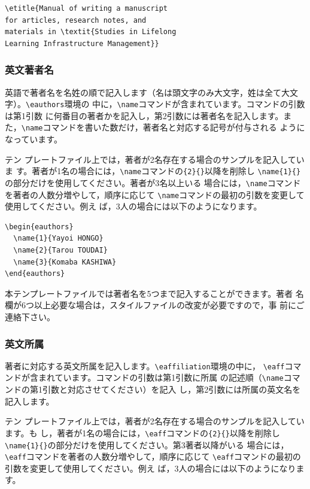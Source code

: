 \documentclass[b5paper,10pt,twocolumn,tombow]{jarticle}
\begin{document}
\begin{verbatim}
\etitle{Manual of writing a manuscript
for articles, research notes, and
materials in \textit{Studies in Lifelong
Learning Infrastructure Management}}
\end{verbatim}

\subsubsection{英文著者名}
英語で著者名を名姓の順で記入します（名は頭文字のみ大文字，姓は全て大文字）。\verb|\eauthors|環境の
中に，\verb|\name|コマンドが含まれています。コマンドの引数は第1引数
に何番目の著者かを記入し，第2引数には著者名を記入します。ま
た，\verb|\name|コマンドを書いた数だけ，著者名と対応する記号が付与される
ようになっています。


テン
プレートファイル上では，著者が2名存在する場合のサンプルを記入していま
す。著者が1名の場合には，\verb|\name|コマンドの\verb|{2}{}|以降を削除し
\verb|\name{1}{}|の部分だけを使用してください。著者が3名以上いる
場合には，\verb|\name|コマンドを著者の人数分増やして，順序に応じて
\verb|\name|コマンドの最初の引数を変更して使用してください。例え
ば，3人の場合には以下のようになります。
\begin{verbatim}
\begin{eauthors}
  \name{1}{Yayoi HONGO}
  \name{2}{Tarou TOUDAI}
  \name{3}{Komaba KASHIWA}
\end{eauthors}
\end{verbatim}
本テンプレートファイルでは著者名を5つまで記入することができます。著者
名欄が6つ以上必要な場合は，スタイルファイルの改変が必要ですので，事
前にご連絡下さい。


\subsubsection{英文所属}
著者に対応する英文所属を記入します。\verb|\eaffiliation|環境の中に，
\verb|\eaff|コマンドが含まれています。コマンドの引数は第1引数に所属
の記述順（\verb|\name|コマンドの第1引数と対応させてください）を記入
し，第2引数には所属の英文名を記入します。


テン
プレートファイル上では，著者が2名存在する場合のサンプルを記入しています。も
し，著者が1名の場合には，\verb|\eaff|コマンドの\verb|{2}{}|以降を削除し
\verb|\name{1}{}|の部分だけを使用してください。第3著者以降がいる
場合には，\verb|\eaff|コマンドを著者の人数分増やして，順序に応じて
\verb|\eaff|コマンドの最初の引数を変更して使用してください。例え
ば，3人の場合には以下のようになります。
\end{document}
